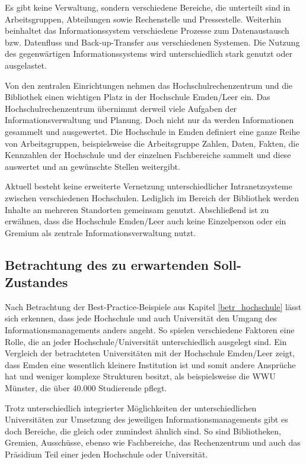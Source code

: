 Es gibt keine Verwaltung, sondern verschiedene Bereiche, die unterteilt sind in Arbeitsgruppen, Abteilungen sowie Rechenstelle und Pressestelle. Weiterhin beinhaltet das Informationssystem verschiedene Prozesse zum Datenaustausch bzw. Datenfluss und Back-up-Transfer aus verschiedenen Systemen.  Die Nutzung des gegenwärtigen Informationssystems wird unterschiedlich stark genutzt oder ausgelastet. 

Von den zentralen Einrichtungen nehmen das Hochschulrechenzentrum und die Bibliothek einen wichtigen Platz in der Hochschule Emden/Leer ein. Das Hochschulrechenzentrum übernimmt derweil viele Aufgaben der Informationsverwaltung und Planung. Doch nicht nur da werden Informationen gesammelt und ausgewertet. Die Hochschule in Emden definiert eine ganze Reihe von Arbeitsgruppen, beispielsweise die Arbeitsgruppe Zahlen, Daten, Fakten, die Kennzahlen der Hochschule und der einzelnen Fachbereiche sammelt und diese auswertet und an gewünschte Stellen weitergibt.  

Aktuell besteht keine erweiterte Vernetzung unterschiedlicher Intranetzsysteme zwischen verschiedenen Hochschulen. Lediglich im Bereich der Bibliothek werden Inhalte an mehreren Standorten gemeinsam genutzt. Abschließend ist zu erwähnen, dass die Hochschule Emden/Leer auch keine Einzelperson oder ein Gremium als zentrale Informationsverwaltung nutzt.


\subsection{Betrachtung des zu erwartenden Soll-Zustandes }
\label{subsection_betrachtung_soll}

Nach Betrachtung der Best-Practice-Beispiele aus Kapitel \ref{betr_hochschule} lässt sich erkennen, dass jede Hochschule und auch Universität den Umgang des Informationsmanagements anders angeht. So spielen verschiedene Faktoren eine Rolle, die an jeder Hochschule/Universität unterschiedlich ausgelegt sind. Ein Vergleich der betrachteten Universitäten mit der Hochschule Emden/Leer zeigt, dass Emden eine wesentlich kleinere Institution ist und somit andere Ansprüche hat und weniger komplexe Strukturen besitzt, als beispielsweise die WWU Münster, die über 40.000 Studierende pflegt. 

Trotz unterschiedlich integrierter Möglichkeiten der unterschiedlichen Universitäten zur Umsetzung des jeweiligen Informationsmanagements gibt es doch Bereiche, die gleich oder zumindest ähnlich sind. So sind Bibliotheken, Gremien, Ausschüsse, ebenso wie Fachbereiche, das Rechenzentrum und auch das Präsidium Teil einer jeden Hochschule oder Universität. 

